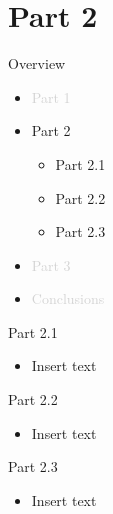 \documentclass[aspectratio=169]{beamer}
\begin{document}
\section{Part 2}
\begin{frame}{Overview}
    \begin{itemize}
        \item \textcolor{lightgrey}{Part 1}
        \vspace{2mm}
        \item Part 2
        \vspace{2mm}
        \begin{itemize}
            \item Part 2.1
            \item Part 2.2
            \item Part 2.3
        \end{itemize}
        \vspace{2mm}
        \item \textcolor{lightgrey}{Part 3}
        \vspace{2mm}
        \item \textcolor{lightgrey}{Conclusions}
    \end{itemize}
\end{frame}

\begin{frame}{Part 2.1}
    \begin{itemize}
        \item Insert text
    \end{itemize}
\end{frame}

\begin{frame}{Part 2.2}
    \begin{itemize}
        \item Insert text
    \end{itemize}
\end{frame}

\begin{frame}{Part 2.3}
    \begin{itemize}
        \item Insert text
    \end{itemize}
\end{frame}
\end{document}
